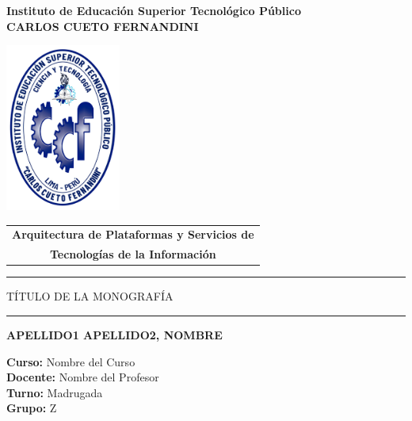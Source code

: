 \begin{titlepage}
    \begin{center}
        \vspace*{1cm}
        {\huge \textbf{Instituto de Educación Superior Tecnológico Público}}\\[3pt]
        {\Large \textbf{CARLOS CUETO FERNANDINI}}
        
        \vspace{1.2cm}
        \includegraphics[height=5.5cm]{img/logo_cueto.png}
        \vspace{0.8cm}
        
        \begin{tabular}{c}
        \LARGE\textbf{Arquitectura de Plataformas y Servicios de} \\
        \LARGE\textbf{Tecnologías de la Información}
        \end{tabular}
        \vspace{1cm}
        
        \textcolor{azul}{\rule{\linewidth}{0.75mm}}
        \vspace{5pt}
        \begin{spacing}{1.3}
            {\LARGE \textsc{TÍTULO DE LA MONOGRAFÍA}}
        \end{spacing}
        \vspace{5pt}
        \textcolor{azul}{\rule{\linewidth}{0.75mm}}
        
        \vspace{1.5cm}
        {\LARGE \textbf{APELLIDO1 APELLIDO2, NOMBRE}}
        \vspace{1.2cm}
        
        \begin{minipage}{0.6\textwidth}
            \centering
            {\Large \textbf{Curso:} \large Nombre del Curso}\\[8pt]
            {\Large \textbf{Docente:} \large Nombre del Profesor}\\[8pt]
            {\Large \textbf{Turno:} \large Madrugada}\\[8pt]
            {\Large \textbf{Grupo:} \large Z}
        \end{minipage}
        

\end{center}
\end{titlepage}
